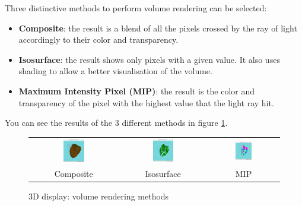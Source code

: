 \documentclass[a4paper,10pt,oneside]{article}
\begin{document}
Three distinctive methods to perform volume rendering can be selected:
\begin{itemize}
\item \textbf{Composite}: the result is a blend of all the pixels crossed by
the ray of light accordingly to their color and transparency.
\item \textbf{Isosurface}: the result shows only pixels with a given
value. It also uses shading to allow a better visualisation of the volume.
\item \textbf{Maximum Intensity Pixel (MIP)}: the result is the color and
transparency of the pixel with the highest value that the light ray hit.
\end{itemize}
You can see the results of the 3 different methods in figure 
\ref{fig:dis3D_volren_method}.

\begin{figure}
\centering
\begin{tabular}{ccc}
\includegraphics[width=0.25\textwidth]{images/dis3D_volren_compo.png} & 
\includegraphics[width=0.25\textwidth]{images/dis3D_volren_iso.png} &
\includegraphics[width=0.25\textwidth]{images/dis3D_volren_mip.png} \\ 
Composite &
Isosurface &
MIP \\ 
\end{tabular}
\caption{3D display: volume rendering methods}
\label{fig:dis3D_volren_method}
\end{figure}
\end{document}

